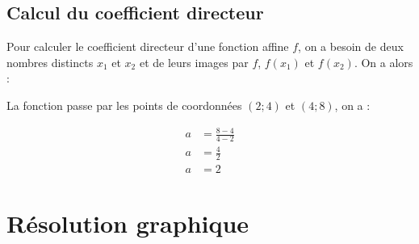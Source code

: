 \documentclass[12pt,a4paper]{article}
\begin{document}
\subsection{Calcul du coefficient directeur}

\begin{mymeth}
	Pour calculer le coefficient directeur d'une fonction affine $f$, on a besoin de deux nombres distincts $x_1$ et $x_2$ et de leurs images par $f$, $f(x_1)$ et $f(x_2)$. On a alors :
	
\end{mymeth}


\begin{myex}
	La fonction passe par les points de coordonnées $(2;4)$ et $(4;8)$, on a :
	
	\begin{align*}
		a &= \frac{8-4}{4-2} \\
		a &= \frac{4}{2} \\
		a &= 2
	\end{align*}
\end{myex}
\section{Résolution graphique}
\end{document}
